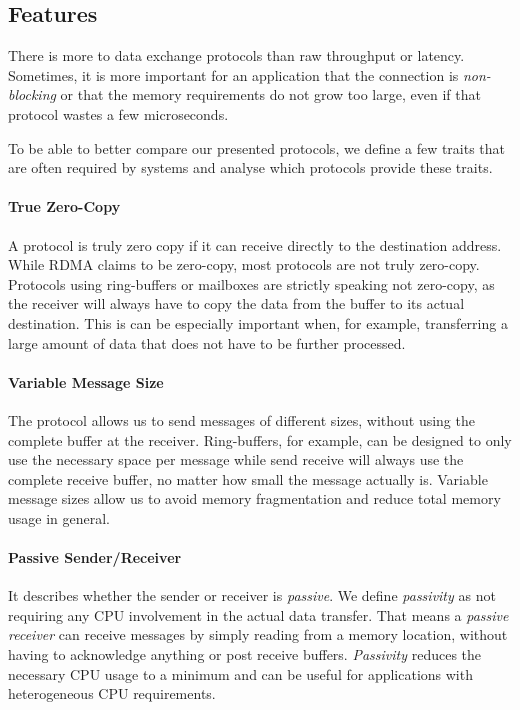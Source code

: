 \subsection{Features} \label{sec:features} 


There is more to data exchange protocols than raw throughput or latency. Sometimes, it is more important for an application
that the connection is \emph{non-blocking} or that the memory requirements do not grow too large, even if that protocol wastes
a few microseconds.

To be able to better compare our presented protocols, we define a few traits that are often required by systems and
analyse which protocols provide these traits.

\paragraph{True Zero-Copy} A protocol is truly zero copy if it can receive directly to the destination address. While RDMA 
claims to be zero-copy, most protocols are not truly zero-copy. Protocols using ring-buffers or mailboxes are
strictly speaking not zero-copy, as the receiver will always have to copy the data from the buffer to its actual destination.
This is can be especially important when, for example, transferring a large amount of data that does not have to be further processed.

\paragraph{Variable Message Size} The protocol allows us to send messages of different sizes, without using the 
complete buffer at the receiver. Ring-buffers, for example, can be designed to only use the necessary space per message
while send receive will always use the complete receive buffer, no matter how small the message actually is. Variable
message sizes allow us to avoid memory fragmentation and reduce total memory usage in general.

\paragraph{Passive Sender/Receiver} It describes whether the sender or receiver is \emph{passive}. We define \emph{passivity} as not 
requiring any CPU involvement in the actual data transfer. That means a \emph{passive receiver} can receive messages by
simply reading from a memory location, without having to acknowledge anything or post receive buffers. \emph{Passivity} 
reduces the necessary CPU usage to a minimum and can be useful for applications with heterogeneous CPU requirements.

